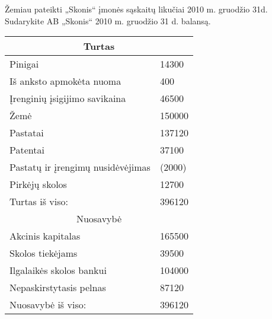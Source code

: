 \begin{tasks}
  \begin{task}
    \begin{condition}
      Žemiau pateikti „Skonis“ įmonės sąskaitų likučiai 2010 m.
      gruodžio 31d. Sudarykite AB „Skonis“ 2010 m. gruodžio 31 d.
      balansą.
    \end{condition}
    \begin{solution}
      \begin{tabularx}{\tablewidth}[]{l | X}
        \multicolumn{2}{c}{Turtas} \\
        \hline
        Pinigai & 14300 \\
        Iš anksto apmokėta nuoma & 400 \\
        Įrenginių įsigijimo savikaina & 46500 \\
        Žemė & 150000 \\
        Pastatai & 137120 \\
        Patentai & 37100 \\
        Pastatų ir įrengimų nusidėvėjimas & (2000) \\
        Pirkėjų skolos & 12700 \\
        \hline
        Turtas iš viso: & 396120 \\
        \multicolumn{2}{c}{Nuosavybė} \\
        \hline
        Akcinis kapitalas & 165500 \\
        Skolos tiekėjams & 39500 \\
        Ilgalaikės skolos bankui & 104000 \\
        Nepaskirstytasis pelnas & 87120 \\
        \hline
        Nuosavybė iš viso: & 396120 \\
      \end{tabularx}
    \end{solution}
  \end{task}


\end{tasks}
